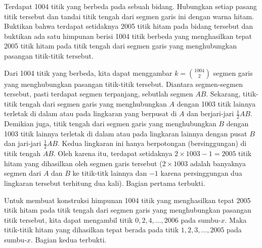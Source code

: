 \documentclass[11pt]{scrartcl}
\begin{document}
\begin{soaljawab}
    Terdapat 1004 titik yang berbeda pada sebuah bidang. Hubungkan setiap pasang titik tersebut dan tandai titik tengah dari segmen garis ini dengan warna hitam. Buktikan bahwa terdapat setidaknya 2005 titik hitam pada bidang tersebut dan buktikan ada satu himpunan berisi 1004 titik berbeda yang menghasilkan tepat 2005 titik hitam pada titik tengah dari segmen garis yang menghubungkan pasangan titik-titik tersebut.
    \begin{solusi}
        Dari 1004 titik yang berbeda, kita dapat menggambar $k = {1004 \choose 2}$ segmen garis yang menghubungkan pasangan titik-titik tersebut. Diantara segmen-segmen tersebut, pasti terdapat segmen terpanjang, sebutlah segmen $AB$. Sekarang, titik-titik tengah dari segmen garis yang menghubungkan $A$ dengan 1003 titik lainnya terletak di dalam atau pada lingkaran yang berpusat di $A$ dan berjari-jari $\frac12 AB$. Demikian juga, titik tengah dari segmen garis yang menghubungkan $B$ dengan 1003 titik lainnya terletak di dalam atau pada lingkaran lainnya dengan pusat $B$ dan jari-jari $\frac12 AB$. Kedua lingkaran ini hanya berpotongan (bersinggungan) di titik tengah $AB$. Oleh karena itu, terdapat setidaknya $2 \times 1003 - 1 = 2005$  titik hitam yang dihasilkan oleh segmen garis tersebut ($2 \times 1003$ adalah banyaknya segmen dari $A$ dan $B$ ke titik-titk lainnya dan $-1$ karena persinggungan dua lingkaran tersebut terhitung dua kali). Bagian pertama terbukti.
        
        Untuk membuat konstruksi himpunan 1004 titik yang menghasilkan tepat 2005 titik hitam pada titik tengah dari segmen garis yang menghubungkan pasangan titik tersebut, kita dapat mengambil titik $0, 2, 4, \dots, 2006$ pada sumbu-$x$. Maka titik-titik hitam yang dihasilkan tepat berada pada titik $1, 2, 3, ..., 2005$ pada sumbu-$x$. Bagian kedua terbukti.
    \end{solusi}
\end{soaljawab}
\end{document}
